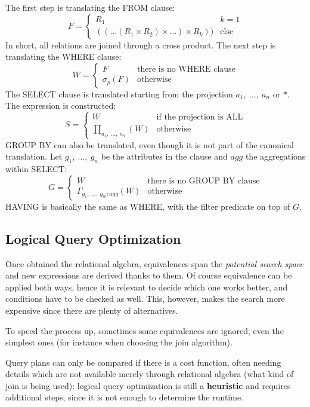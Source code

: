 The first step is translating the FROM clause:
$$F = \begin{cases}
R_1 & k = 1 \\
((\dots (R_1 \times R_2) \times \dots) \times R_k)) & \text{else}
\end{cases}$$
In short, all relations are joined through a cross product. The next step is translating the WHERE clause:
$$W = \begin{cases}
F & \text{there is no WHERE clause} \\
\sigma_p(F) & \text{otherwise}
\end{cases}$$
The SELECT clause is translated starting from the projection $a_1,\ \dots,\ a_n$ or $*$. The expression is constructed:
$$S = \begin{cases}
W & \text{if the projection is ALL} \\
\prod_{a_1,\ \dots,\ a_n}(W) & \text{otherwise}
\end{cases}$$
GROUP BY can also be translated, even though it is not part of the canonical translation. Let $g_1,\ \dots,\ g_n$ be the attributes in the clause and $agg$ the aggregations within SELECT:
$$G = \begin{cases}
W & \text{there is no GROUP BY clause} \\
\Gamma_{g_1,\ \dots,\ g_m:agg}(W) & \text{otherwise}
\end{cases}$$
HAVING is basically the same as WHERE, with the filter predicate on top of $G$.

\subsection{Logical Query Optimization}
Once obtained the relational algebra, equivalences span the \textit{potential search space} and new expressions are derived thanks to them. Of course equivalence can be applied both ways, hence it is relevant to decide which one works better, and conditions have to be checked as well. This, however, makes the search more expensive since there are plenty of alternatives.

To speed the process up, sometimes some equivalences are ignored, even the simplest ones (for instance when choosing the join algorithm).

Query plans can only be compared if there is a cost function, often needing details which are not available merely through relational algebra (what kind of join is being used): logical query optimization is still a \textbf{heuristic} and requires additional steps, since it is not enough to determine the runtime.

